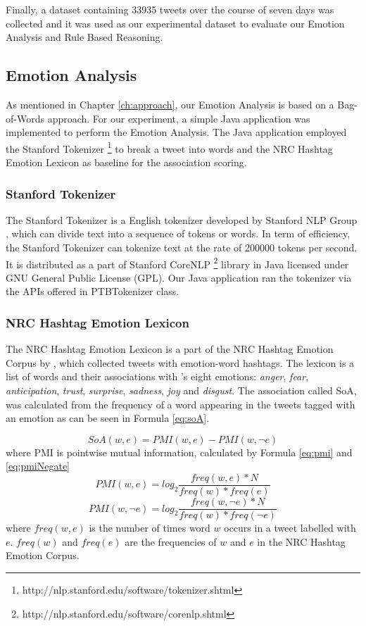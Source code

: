 Finally, a dataset containing 33935 tweets over the course of seven days was collected and it was used as our experimental dataset to evaluate our Emotion Analysis and Rule Based Reasoning.

\subsection{Emotion Analysis}
As mentioned in Chapter \ref{ch:approach}, our Emotion Analysis is based on a Bag-of-Words approach. For our experiment, a simple Java application was implemented to perform the Emotion Analysis. The Java application employed the Stanford Tokenizer \footnote{http://nlp.stanford.edu/software/tokenizer.shtml} to break a tweet into words and the NRC Hashtag Emotion Lexicon \citep{mohammad2014using} as baseline for the association scoring.

\subsubsection{Stanford Tokenizer}
The Stanford Tokenizer is a English tokenizer developed by Stanford NLP Group \citep{manning-EtAl:2014:P14-5}, which can divide text into a sequence of tokens or words. In term of efficiency, the Stanford Tokenizer can tokenize text at the rate of 200000 tokens per second. It is distributed as a part of Stanford CoreNLP \footnote{http://nlp.stanford.edu/software/corenlp.shtml} library in Java licensed under GNU General Public License (GPL). Our Java application ran the tokenizer via the APIs offered in PTBTokenizer class.

\subsubsection{NRC Hashtag Emotion Lexicon}
The NRC Hashtag Emotion Lexicon is a part of the NRC Hashtag Emotion Corpus by \citet{mohammad2014using}, which collected tweets with emotion-word hashtags. The lexicon is a list of words and their associations with \citep{plutchik2001nature}'s eight emotions: \textit{anger}, \textit{fear}, \textit{anticipation}, \textit{trust}, \textit{surprise}, \textit{sadness}, \textit{joy} and \textit{disgust}. The association called SoA, was calculated from the frequency of a word appearing in the tweets tagged with an emotion as can be seen in Formula \ref{eq:soA}.

\begin{equation}
\label{eq:soA}
	SoA(w, e) = PMI(w, e) - PMI(w, \neg{e})
\end{equation}
where PMI is pointwise mutual information, calculated by Formula \ref{eq:pmi} and \ref{eq:pmiNegate}
\begin{equation}
\label{eq:pmi}
	PMI(w, e) = log_2\frac{freq(w, e) * N}{freq(w) * freq(e)}
\end{equation}
\begin{equation}
\label{eq:pmiNegate}
	PMI(w, \neg{e}) = log_2\frac{freq(w, \neg{e}) * N}{freq(w) * freq(\neg{e})}	
\end{equation}
where \(freq(w,e)\) is the number of times word \(w\) occurs in a tweet labelled with \(e\). \(freq(w)\) and \(freq(e)\) are the frequencies of \(w\) and \(e\) in the NRC Hashtag Emotion Corpus.

